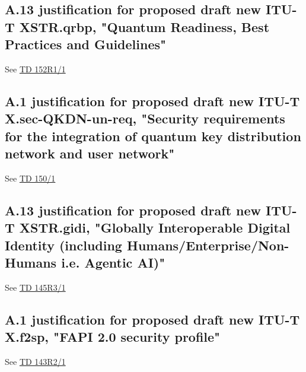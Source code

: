 \newpage

\subsection*{A.13 justification for proposed draft new ITU-T XSTR.qrbp, "Quantum Readiness, Best Practices and Guidelines"}
See \href{https://www.itu.int/md/meetingdoc.asp?lang=en\&parent=T25-SG17-251203-TD-WP1-0152}{TD 152R1/1}

\newpage

\subsection*{A.1 justification for proposed draft new ITU-T X.sec-QKDN-un-req, "Security requirements for the integration of quantum key distribution network and user network"}
See \href{https://www.itu.int/md/meetingdoc.asp?lang=en\&parent=T25-SG17-251203-TD-WP1-0150}{TD 150/1}

\newpage

\subsection*{A.13 justification for proposed draft new ITU-T XSTR.gidi, "Globally Interoperable Digital Identity (including Humans/Enterprise/Non-Humans i.e. Agentic AI)"}
See \href{https://www.itu.int/md/meetingdoc.asp?lang=en\&parent=T25-SG17-251203-TD-WP1-0145}{TD 145R3/1}

\newpage

\subsection*{A.1 justification for proposed draft new ITU-T X.f2sp, "FAPI 2.0 security profile"}
See \href{https://www.itu.int/md/meetingdoc.asp?lang=en\&parent=T25-SG17-251203-TD-WP1-0143}{TD 143R2/1}

